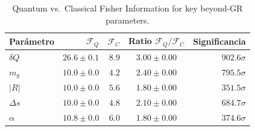 \begin{table}[ht]
\centering
\caption{Quantum vs.\ Classical Fisher Information for key beyond-GR parameters.}
\begin{tabular}{lrrcr}
\toprule
Parámetro & $\mathcal{F}_Q$ & $\mathcal{F}_C$ & Ratio $\mathcal{F}_Q/\mathcal{F}_C$ & Significancia \\
\midrule
$δQ$ & $26.6\pm0.1$ & $8.9$ & $3.00\pm0.00$ & $902.6\sigma$ \\
$m_g$ & $10.0\pm0.0$ & $4.2$ & $2.40\pm0.00$ & $795.5\sigma$ \\
$|R|$ & $10.0\pm0.0$ & $5.6$ & $1.80\pm0.00$ & $351.5\sigma$ \\
$Δs$ & $10.0\pm0.0$ & $4.8$ & $2.10\pm0.00$ & $684.7\sigma$ \\
$α$ & $10.8\pm0.0$ & $6.0$ & $1.80\pm0.00$ & $374.6\sigma$ \\
\bottomrule
\end{tabular}
\end{table}